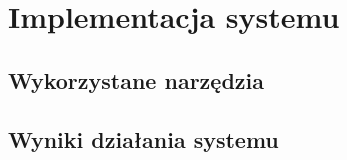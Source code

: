 \section{Implementacja systemu}

\subsection{Wykorzystane narzędzia}
\subsection{Wyniki działania systemu}